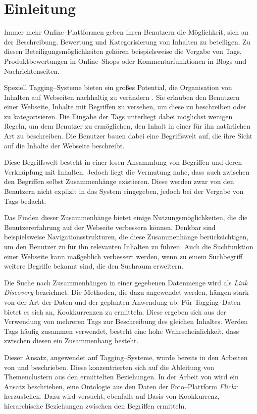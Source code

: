 \chapter{Einleitung}

Immer mehr Online--Plattformen geben ihren Benutzern die Möglichkeit, sich an der Beschreibung, Bewertung und Kategorisierung von Inhalten zu beteiligen. Zu diesen Beteiligungsmöglichkeiten gehören beispielsweise die Vergabe von Tags, Produktbewertungen in Online--Shops oder Kommentarfunktionen in Blogs und Nachrichtenseiten. 

Speziell Tagging--Systeme bieten ein großes Potential, die Organisation von Inhalten auf Webseiten nachhaltig zu verändern \cite{sc2005}. Sie erlauben den Benutzern einer Webseite, Inhalte mit Begriffen zu versehen, um diese zu beschreiben oder zu kategorisieren. Die Eingabe der Tags unterliegt dabei möglichst wenigen Regeln, um dem Benutzer zu ermöglichen, den Inhalt in einer für ihn natürlichen Art zu beschreiben. Die Benutzer bauen dabei eine Begriffswelt auf, die ihre Sicht auf die Inhalte der Webseite beschreibt.

Diese Begriffswelt besteht in einer losen Ansammlung von Begriffen und deren Verknüpfung mit Inhalten. Jedoch liegt die Vermutung nahe, dass auch zwischen den Begriffen selbst Zusammenhänge existieren. Diese werden zwar von den Benutzern nicht explizit in das System eingegeben, jedoch bei der Vergabe von Tags bedacht.

Das Finden dieser Zusammenhänge bietet einige Nutzungsmöglichkeiten, die die Benutzererfahrung auf der Webseite verbessern können. Denkbar sind beispielsweise Navigationsstrukturen, die diese Zusammenhänge berücksichtigen, um den Benutzer zu für ihn relevanten Inhalten zu führen. Auch die Suchfunktion einer Webseite kann maßgeblich verbessert werden, wenn zu einem Suchbegriff weitere Begriffe bekannt sind, die den Suchraum erweitern.

Die Suche nach Zusammenhängen in einer gegebenen Datenmenge wird als \emph{Link Discovery} bezeichnet. Die Methoden, die dazu angewendet werden, hängen stark von der Art der Daten und der geplanten Anwendung ab. Für Tagging--Daten bietet es sich an, Kookkurrenzen zu ermitteln. Diese ergeben sich aus der Verwendung von mehreren Tags zur Beschreibung des gleichen Inhaltes. Werden Tags häufig zusammen verwendet, besteht eine hohe Wahrscheinlichkeit, dass zwischen diesen ein Zusammenhang besteht. 

Dieser Ansatz, angewendet auf Tagging--Systeme, wurde bereits in den Arbeiten von \textcite{ps2006} und \textcite{kss2010} beschrieben. Diese konzentrierten sich auf die Ableitung von Themenclustern aus den ermittelten Beziehungen. In der Arbeit von \textcite{ps2006} wird ein Ansatz beschrieben, eine Ontologie aus den Daten der Foto--Plattform \emph{Flickr} herzustellen. Dazu wird versucht, ebenfalls auf Basis von Kookkurrenz, hierarchische Beziehungen zwischen den Begriffen ermitteln.

